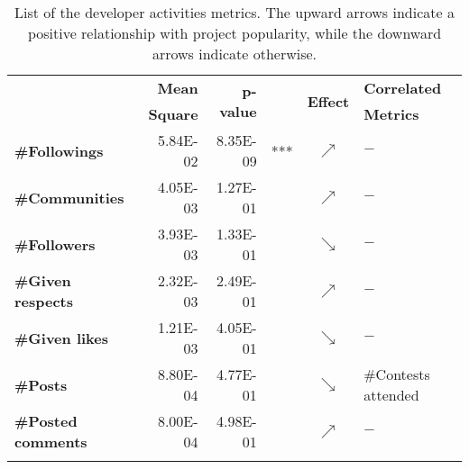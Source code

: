 \begin{table}[t]
\centering
\scriptsize
\setlength{\tabcolsep}{2.5pt}
\caption{List of the developer activities metrics. The upward arrows indicate a positive relationship with project popularity, while the downward arrows indicate otherwise.}
\label{table:RQ5}
	\begin{tabularx}{0.8\columnwidth}{>{\bfseries}lrrlcl}
	\hline
	\multirow{2}{*}{Metric} & \textbf{Mean}  & \multirow{2}{*}{\textbf{p-value}}  &     & \multirow{2}{*}{\textbf{Effect}}     &\textbf{Correlated}\\
	&\textbf{Square}&& &&\textbf{Metrics} \\
	\hline	\hline
\#Followings     & 5.84E-02 & 8.35E-09 & *** & $\nearrow$ &              $-$        \\
\#Communities       & 4.05E-03 & 1.27E-01 &     & $\nearrow$ &             $-$         \\
\#Followers      & 3.93E-03 & 1.33E-01 &     & $\searrow$ &              $-$        \\
\#Given respects      & 2.32E-03 & 2.49E-01 &     & $\nearrow$ &               $-$       \\
\#Given likes           & 1.21E-03 & 4.05E-01 &     & $\searrow$ &              $-$        \\
\#Posts           & 8.80E-04 & 4.77E-01 &     & $\searrow$ & \#Contests attended            \\
\#Posted comments & 8.00E-04 & 4.98E-01 &     & $\nearrow$ &              $-$          \\ \hline
\multicolumn{6}{l}{$p-value$ codes:  `***'$<0$, `**'$<0.001$, `*'$<0.01$, `.'$<0.05$}\\                      
	\end{tabularx}
\end{table}
